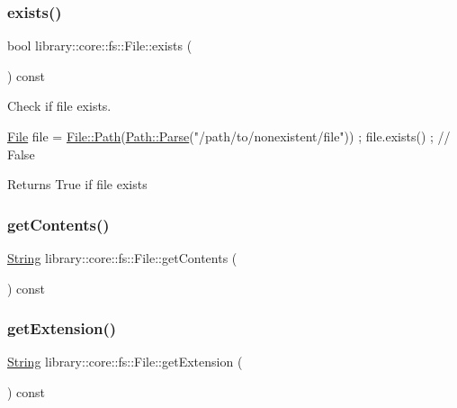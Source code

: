 \subsubsection{\texorpdfstring{exists()}{exists()}}
{\footnotesize\ttfamily bool library\+::core\+::fs\+::\+File\+::exists (\begin{DoxyParamCaption}{ }\end{DoxyParamCaption}) const}



Check if file exists. 


\begin{DoxyCode}
\hyperlink{classlibrary_1_1core_1_1fs_1_1_file_a6f3f0d79545ac9984c6f49432f0c6c39}{File} file = \hyperlink{classlibrary_1_1core_1_1fs_1_1_file_a72d6cdf8bb7e299889c6149e2b8a6cc7}{File::Path}(\hyperlink{classlibrary_1_1core_1_1fs_1_1_path_a6ba644b6609507e724c217bf2020f5ae}{Path::Parse}(\textcolor{stringliteral}{"/path/to/nonexistent/file"})) ;
file.exists() ; \textcolor{comment}{// False}
\end{DoxyCode}


\begin{DoxyReturn}{Returns}
True if file exists 
\end{DoxyReturn}
\mbox{\label{classlibrary_1_1core_1_1fs_1_1_file_a0a48a4d886d255e53e35511f1519e7fa}} 
\subsubsection{\texorpdfstring{get\+Contents()}{getContents()}}
{\footnotesize\ttfamily \hyperlink{classlibrary_1_1core_1_1types_1_1_string}{String} library\+::core\+::fs\+::\+File\+::get\+Contents (\begin{DoxyParamCaption}{ }\end{DoxyParamCaption}) const}

\mbox{\label{classlibrary_1_1core_1_1fs_1_1_file_acfb85ab6934afc65ecf53a1a08775f84}} 
\subsubsection{\texorpdfstring{get\+Extension()}{getExtension()}}
{\footnotesize\ttfamily \hyperlink{classlibrary_1_1core_1_1types_1_1_string}{String} library\+::core\+::fs\+::\+File\+::get\+Extension (\begin{DoxyParamCaption}{ }\end{DoxyParamCaption}) const}



